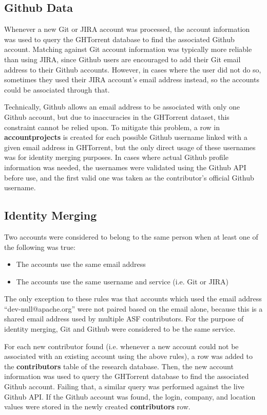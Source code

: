 \subsection{Github Data}
Whenever a new Git or JIRA account was processed, the account information was used to query the GHTorrent database to find the associated Github account. Matching against Git account information was typically more reliable than using JIRA, since Github users are encouraged to add their Git email address to their Github accounts. However, in cases where the user did not do so, sometimes they used their JIRA account's email address instead, so the accounts could be associated through that.

Technically, Github allows an email address to be associated with only one Github account, but due to inaccuracies in the GHTorrent dataset, this constraint cannot be relied upon. To mitigate this problem, a row in \textbf{accountprojects} is created for each possible Github username linked with a given email address in GHTorrent, but the only direct usage of these usernames was for identity merging purposes. In cases where actual Github profile information was needed, the usernames were validated using the Github API before use, and the first valid one was taken as the contributor's official Github username.
\subsection{Identity Merging}
Two accounts were considered to belong to the same person when at least one of the following was true:
\begin{itemize}
	\item The accounts use the same email address
	\item The accounts use the same username and service (i.e. Git or JIRA)
\end{itemize}
The only exception to these rules was that accounts which used the email address ``dev-null@apache.org'' were not paired based on the email alone, because this is a shared email address used by multiple ASF contributors. For the purpose of identity merging, Git and Github were considered to be the same service.

For each new contributor found (i.e. whenever a new account could not be associated with an existing account using the above rules), a row was added to the \textbf{contributors} table of the research database. Then, the new account information was used to query the GHTorrent database to find the associated Github account. Failing that, a similar query was performed against the live Github API. If the Github account was found, the login, company, and location values were stored in the newly created \textbf{contributors} row.

